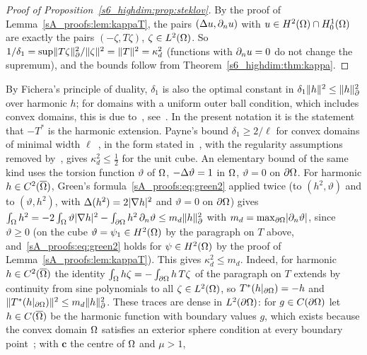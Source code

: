 \begin{proof}[Proof of Proposition~\ref{s6_highdim:prop:steklov}]
By the proof of Lemma~\ref{sA_proofs:lem:kappaT}, the pairs $(\Delta u,\partial_n u)$ with
$u\in H^2(\Omega)\cap H^1_0(\Omega)$ are exactly the pairs $(-\zeta,T\zeta)$, $\zeta\in L^2(\Omega)$. So
$1/\delta_1=\sup\lVert T\zeta\rVert_{\partial}^2/\lVert \zeta\rVert^2=\lVert T\rVert^2=\kappa_d^2$ (functions with $\partial_n u=0$ do not
change the supremum), and the bounds follow from Theorem~\ref{s6_highdim:thm:kappa}.
\end{proof}

\begin{remark}\label{sA_proofs:rem:steklov}
By Fichera's principle of duality, $\delta_1$ is also the optimal constant in
$\delta_1\lVert h\rVert^2\le\lVert h\rVert_{\partial}^2$ over harmonic $h$; for domains with a uniform outer ball condition,
which includes convex domains, this is due to~\citet{bucur2009first}, see~\citet[Sec.~3]{bucur2011first}.
In the present notation it is the statement that $-T^*$ is the harmonic extension. Payne's bound
$\delta_1\ge2/\ell$ for convex domains of minimal width $\ell$~\citep{payne1968bounds}, in the form
stated in~\citet[Lemma~5.3]{bucur2011first}, with the regularity assumptions removed
by~\citet{philippin2010extending}, gives $\kappa_d^2\le\frac12$ for the unit cube. An elementary
bound of the same kind uses the torsion
function $\vartheta$ of $\Omega$, $-\Delta\vartheta=1$ in $\Omega$, $\vartheta=0$ on $\partial\Omega$. For harmonic $h\in
C^2(\overline{\Omega})$, Green's formula~\eqref{sA_proofs:eq:green2} applied twice (to $(h^2,\vartheta)$ and
to $(\vartheta,h^2)$, with $\Delta(h^2)=2\lvert \nabla h\rvert^2$ and $\vartheta=0$ on $\partial\Omega$) gives
$\int_\Omega h^2=-2\int_\Omega\vartheta\lvert \nabla h\rvert^2-\int_{\partial\Omega}h^2\,\partial_n\vartheta\le m_d\lVert h\rVert_{\partial}^2$ with
$m_d=\max_{\partial\Omega}\lvert \partial_n\vartheta\rvert$, since $\vartheta\ge0$ (on the cube $\vartheta=\psi_1\in H^2(\Omega)$ by the paragraph on $T$
above, and~\eqref{sA_proofs:eq:green2} holds for $\psi\in H^2(\Omega)$ by the proof of
Lemma~\ref{sA_proofs:lem:kappaT}). This gives $\kappa_d^2\le m_d$. Indeed, for harmonic $h\in
C^2(\overline{\Omega})$ the identity $\int_\Omega h\zeta=-\int_{\partial\Omega}h\,T\zeta$ of the paragraph on $T$
extends by continuity from sine polynomials to all $\zeta\in L^2(\Omega)$, so $T^*(h|_{\partial\Omega})=-h$ and
$\lVert T^*(h|_{\partial\Omega})\rVert^2\le m_d\lVert h\rVert_{\partial}^2$. These traces are dense in $L^2(\partial\Omega)$: for
$g\in C(\partial\Omega)$ let $h\in C(\overline{\Omega})$ be the harmonic function with boundary values $g$, which
exists because the convex domain $\Omega$ satisfies an exterior sphere condition at every boundary
point~\citep[Sec.~2.8]{gilbarg2001}; with $\boldsymbol c$ the centre of $\Omega$ and $\mu>1$,

\end{remark}
